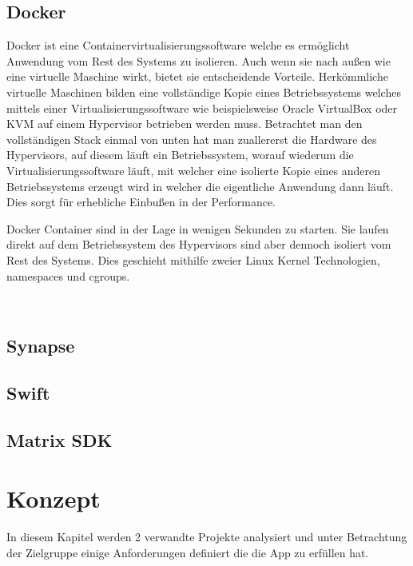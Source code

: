     \section{Docker}\label{sec:docker}
    Docker ist eine Containervirtualisierungssoftware welche es ermöglicht Anwendung vom Rest des Systems zu isolieren.
    Auch wenn sie nach außen wie eine virtuelle Maschine wirkt, bietet sie entscheidende Vorteile.
    Herkömmliche virtuelle Maschinen bilden eine vollständige Kopie eines Betriebssystems welches mittels einer Virtualisierungssoftware wie beispielsweise Oracle VirtualBox oder KVM auf einem Hypervisor betrieben werden muss.
    Betrachtet man den vollständigen Stack einmal von unten hat man zuallererst die Hardware des Hypervisors, auf diesem läuft ein Betriebssystem, worauf wiederum die Virtualisierungssoftware läuft, mit welcher eine isolierte Kopie eines anderen Betriebssystems erzeugt wird in welcher die eigentliche Anwendung dann läuft.
    Dies sorgt für erhebliche Einbußen in der Performance.

    Docker Container sind in der Lage in wenigen Sekunden zu starten.
    Sie laufen direkt auf dem Betriebssystem des Hypervisors sind aber dennoch isoliert vom Rest des Systems.
    Dies geschieht mithilfe zweier Linux Kernel Technologien, namespaces und cgroups.



    ~\cite{docker}

    \section{Synapse}\label{sec:synapse}


    \section{Swift}\label{sec:swift}


    \section{Matrix SDK}\label{sec:matrix-sdk}


    \chapter{Konzept}\label{ch:konzept}
    In diesem Kapitel werden 2 verwandte Projekte analysiert und unter Betrachtung der Zielgruppe einige Anforderungen definiert die die App zu erfüllen hat.

